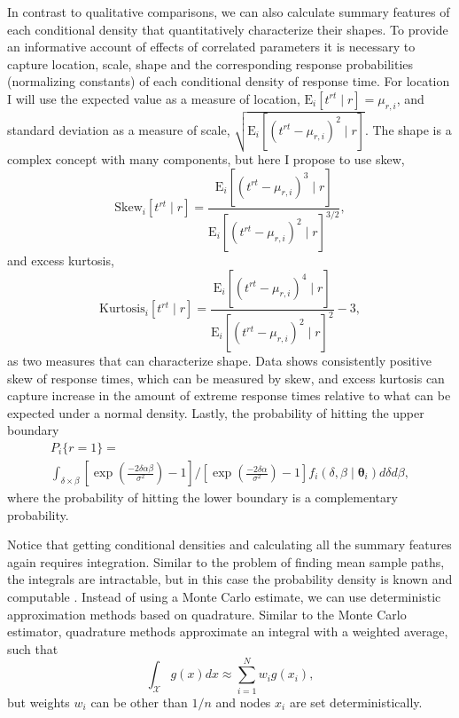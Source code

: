 \documentclass[12pt]{report}
\begin{document}
In contrast to qualitative comparisons, we can also calculate summary features of each conditional density that quantitatively characterize their shapes. To provide an informative account of effects of correlated parameters it is necessary to capture location, scale, shape and the corresponding response probabilities (normalizing constants) of each conditional density of response time. For location I will use the expected value as a measure of location, $\mathrm{E}_i[t^{rt} \mid r] = \mu_{r,i}$, 
and standard deviation as a measure of scale, $\sqrt{\mathrm{E}_i[(t^{rt} - \mu_{r,i})^2 \mid r]}$. The shape is a complex concept with many components, but here I propose to use skew,
\begin{equation}
\mathrm{Skew}_i[t^{rt} \mid r] = \frac{\mathrm{E}_i\left[(t^{rt} - \mu_{r,i})^3 \mid r \right]}{\mathrm{E}_i[(t^{rt} - \mu_{r,i})^2 \mid r]^{3/2}},
\end{equation}
and excess kurtosis,
\begin{equation}
\mathrm{Kurtosis}_i[t^{rt} \mid r] = \frac{\mathrm{E}_i\left[(t^{rt} - \mu_{r,i})^4 \mid r \right]}{\mathrm{E}_i[(t^{rt} - \mu_{r,i})^2 \mid r]^2} - 3,
\end{equation}
as two measures that can characterize shape. Data shows consistently positive skew of response times, which can be measured by skew, and excess kurtosis can capture increase in the amount of extreme response times relative to what can be expected under a normal density. Lastly, the probability of hitting the upper boundary
%
\begin{eqnarray}
P_i\{r = 1\} = \nonumber \\
\int_{\delta \times \beta} \left[\exp\left(\frac{-2\delta\alpha\beta}{\sigma^2}\right)-1\right]/
                \left[\exp\left(\frac{-2\delta \alpha}{\sigma^2}\right)-1\right]f_i(\delta, \beta \mid \boldsymbol{\theta}_i)d\delta d\beta,
\end{eqnarray}
%
where the probability of hitting the lower boundary is a complementary probability.

Notice that getting conditional densities and calculating all the summary features again requires integration. Similar to the problem of finding mean sample paths, the integrals are intractable, but in this case the probability density is known and computable \citep{Tue2004,NavFus2009}. Instead of using a Monte Carlo estimate, we can use deterministic approximation methods based on quadrature. Similar to the Monte Carlo estimator, quadrature methods approximate an integral with a weighted average, such that
\begin{equation}
\int_{\mathcal{X}}g(x)dx \approx \sum_{i=1}^N w_i g(x_i),
\end{equation}
but weights $w_i$ can be other than $1/n$ and nodes $x_i$ are set deterministically.
\end{document}
